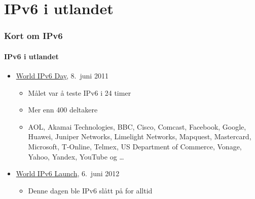 \section{IPv6 i utlandet}
\begin{frame}%
  \frametitle{Kort om IPv6}
  \framesubtitle{IPv6 i utlandet}
  \pause
  \begin{itemize}[<+->]
  \item
    \href{http://www.internetsociety.org/ipv6/archive-2011-world-ipv6-day/}{World
      IPv6 Day}, 8.\ juni 2011
    \begin{itemize}[<+->]
    \item Målet var å teste IPv6 i 24 timer
    \item Mer enn 400 deltakere
    \item AOL, Akamai Technologies, BBC, Cisco, Comcast, Facebook,
      Google, Huawei, Juniper Networks, Limelight Networks, Mapquest,
      Mastercard, Microsoft, T-Online, Telmex, US Department of
      Commerce, Vonage, Yahoo, Yandex, YouTube og \dots
    \end{itemize}
  \item \href{http://www.worldipv6launch.org/}{World IPv6 Launch},
    6.\ juni 2012
    \begin{itemize}[<+->]
    \item Denne dagen ble IPv6 slått på for alltid
    \end{itemize}
  \end{itemize}
\end{frame}

